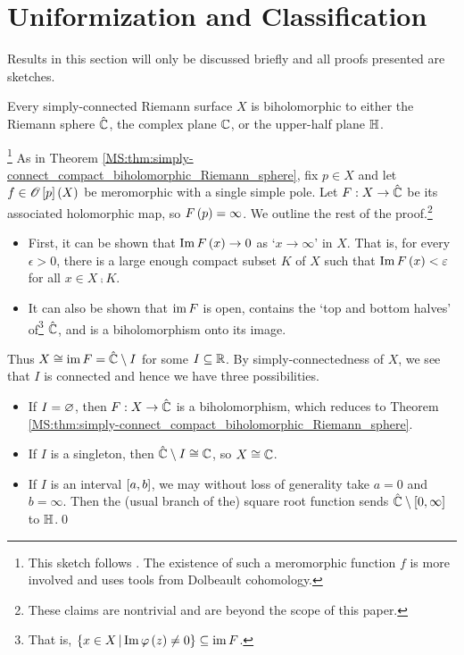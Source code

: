 \documentclass[../Moduli_Spaces_of_Riemann_Surfaces.tex]{subfiles}
\begin{document}
    \section{Uniformization and Classification}\label{sec:uniformization}
    Results in this section will only be discussed briefly and all proofs presented are sketches.
    \begin{theorem}[Uniformization]
        Every simply-connected Riemann surface $X$ is biholomorphic to either the Riemann sphere $\RS$, the complex plane $\C$, or the upper-half plane $\H$.
    \end{theorem}
    \begin{proofsketch}\footnote{This sketch follows \cite{peter}. The existence of such a meromorphic function $f$ is more involved and uses tools from Dolbeault cohomology.}
        As in Theorem \ref{MS:thm:simply-connect_compact_biholomorphic_Riemann_sphere}, fix $p\in X$ and let $f\in\HOLO\l[p\r]\l(X\r)$ be meromorphic with a single simple pole. Let $F:X\to\RS$ be its associated holomorphic map, so $F\l(p\r)=\infty$. We outline the rest of the proof.\footnote{These claims are nontrivial and are beyond the scope of this paper.}
        \begin{itemize}
            \item First, it can be shown that $\Im F\l(x\r)\to0$ as `$x\to\infty$' in $X$. That is, for every $\epsilon>0$, there is a large enough compact subset $K$ of $X$ such that $\Im F\l(x\r)<\epsilon$ for all $x\in X\comp K$.
                \vspace{-0.05in}
            \item It can also be shown that $\im F$ is open, contains the `top and bottom halves' of\footnote{That is, $\l\{x\in X\mid\Im\phi\l(z\r)\neq0\r\}\subseteq\im F$.} $\RS$, and is a biholomorphism onto its image.
        \end{itemize}
        Thus $X\iso\im F=\RS\comp I$ for some $I\subseteq\R$. By simply-connectedness of $X$, we see that $I$ is connected and hence we have three possibilities.
        \begin{itemize}
            \item If $I=\em$, then $F:X\to\RS$ is a biholomorphism, which reduces to Theorem \ref{MS:thm:simply-connect_compact_biholomorphic_Riemann_sphere}.
                \vspace{-0.05in}
            \item If $I$ is a singleton, then $\RS\comp I\iso\C$, so $X\iso\C$.
                \vspace{-0.05in}
            \item If $I$ is an interval $\l[a,b\r]$, we may without loss of generality take $a=0$ and $b=\infty$. Then the (usual branch of the) square root function sends $\RS\comp\l[0,\infty\r]$ to $\H$.\qed
        \end{itemize}
    \end{proofsketch}
\end{document}
